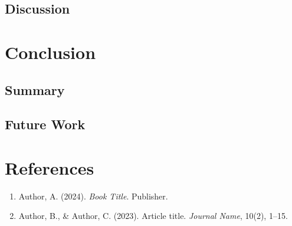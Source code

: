 \documentclass[12pt, a4paper]{report}
\begin{document}
\section{Discussion}
\lipsum[8]

\chapter{Conclusion}

\section{Summary}
\lipsum[9]

\section{Future Work}
\lipsum[10]

\chapter*{References}

\begin{enumerate}
    \item Author, A. (2024). \textit{Book Title}. Publisher.
    \item Author, B., \& Author, C. (2023). Article title. \textit{Journal Name}, 10(2), 1--15.
\end{enumerate}
\end{document}
